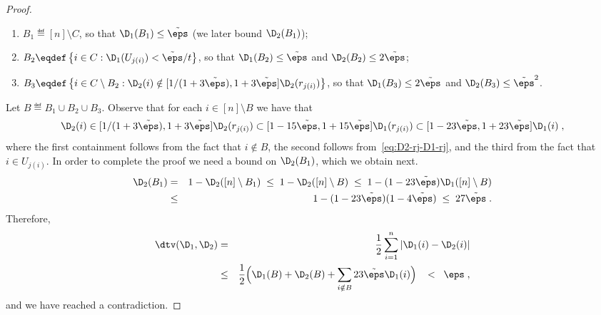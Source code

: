 \begin{proof}
\begin{enumerate}
\item $B_1 \eqdef [n]\setminus C$,
so that $\D_1(B_1) \leq \tilde{\eps}$ (we later bound $\D_2(B_1)$);
\item $B_2 \eqdef
   \left\{i\in C:\D_1(U_{j(i)}) < \tilde{\eps}/t\right\}$, so that
     $\D_1(B_2) \leq \tilde{\eps}$
     and $\D_2(B_2) \leq 2\tilde{\eps}$;
\item $B_3\eqdef \left\{i\in C\setminus B_2:
         \D_2(i) \notin
          [1/(1+3\tilde{\eps}),1+3\tilde{\eps}]\D_2(r_{j(i)})\right\}$, so that
          $\D_1(B_3) \leq 2\tilde{\eps}$ and \mbox{$\D_2(B_3)\leq \tilde{\eps}^2$.}
\end{enumerate}
Let $B \eqdef B_1\cup B_2\cup B_3$.
Observe that for each $i \in [n]\setminus B$
we have that
\begin{equation}\label{eq:D2-i-D1-i}
\D_2(i) \in [1/(1+3\tilde{\eps}),1+3\tilde{\eps}]\D_2(r_{j(i)})
  \subset [1-{15}\tilde{\eps},1+{15}\tilde{\eps}]\D_1(r_{j(i)})     \subset [1-{23}\tilde{\eps},1+{23}\tilde{\eps}]\D_1(i)\;,        \end{equation}
where the first containment follows from the fact that
$i \notin B$, the second follows
from~\cref{eq:D2-rj-D1-rj}, and the third from
the fact that $i\in U_{j(i)}$.
In order to complete the proof we need a bound on $\D_2(B_1)$,
which we obtain next.
\begin{eqnarray}
\D_2(B_1) &=& 1-\D_2([n]\setminus B_1) \;\leq\; 1-\D_2([n]\setminus B)
 \;\leq\; 1 - (1-{23}\tilde{\eps})\D_1([n]\setminus B)\nonumber \\
 & \leq& 1- (1-{23}\tilde{\eps})(1-{4}\tilde{\eps}) \; \leq\; {27}\tilde{\eps}\;.
\end{eqnarray}
Therefore,
\begin{eqnarray}
\dtv(\D_1,\D_2) &=& \frac{1}{2}\sum_{i=1}^n \left|\D_1(i)-\D_2(i)\right|
          \nonumber \\
&\leq& \frac{1}{2}
  \Big(\D_1(B) + \D_2(B)
  + \sum_{i\notin B} {23}\tilde{\eps}\D_1(i)\Big)\;\; \;<\; \;\eps\;,
\end{eqnarray}
and we have reached a contradiction.
\end{proof}

